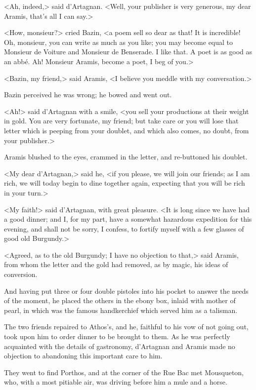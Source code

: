 <Ah, indeed,> said d'Artagnan. <Well, your publisher is very generous, my dear Aramis, that's all I can say.> 

<How, monsieur?> cried Bazin, <a poem sell so dear as that! It is incredible! Oh, monsieur, you can write as much as you like; you may become equal to Monsieur de Voiture and Monsieur de Benserade. I like that. A poet is as good as an abbé. Ah! Monsieur Aramis, become a poet, I beg of you.> 

<Bazin, my friend,> said Aramis, <I believe you meddle with my conversation.> 

Bazin perceived he was wrong; he bowed and went out. 

<Ah!> said d'Artagnan with a smile, <you sell your productions at their weight in gold. You are very fortunate, my friend; but take care or you will lose that letter which is peeping from your doublet, and which also comes, no doubt, from your publisher.> 

Aramis blushed to the eyes, crammed in the letter, and re-buttoned his doublet. 

<My dear d'Artagnan,> said he, <if you please, we will join our friends; as I am rich, we will today begin to dine together again, expecting that you will be rich in your turn.> 

<My faith!> said d'Artagnan, with great pleasure. <It is long since we have had a good dinner; and I, for my part, have a somewhat hazardous expedition for this evening, and shall not be sorry, I confess, to fortify myself with a few glasses of good old Burgundy.> 

<Agreed, as to the old Burgundy; I have no objection to that,> said Aramis, from whom the letter and the gold had removed, as by magic, his ideas of conversion. 

And having put three or four double pistoles into his pocket to answer the needs of the moment, he placed the others in the ebony box, inlaid with mother of pearl, in which was the famous handkerchief which served him as a talisman. 

The two friends repaired to Athos's, and he, faithful to his vow of not going out, took upon him to order dinner to be brought to them. As he was perfectly acquainted with the details of gastronomy, d'Artagnan and Aramis made no objection to abandoning this important care to him. 

They went to find Porthos, and at the corner of the Rue Bac met Mousqueton, who, with a most pitiable air, was driving before him a mule and a horse. 

